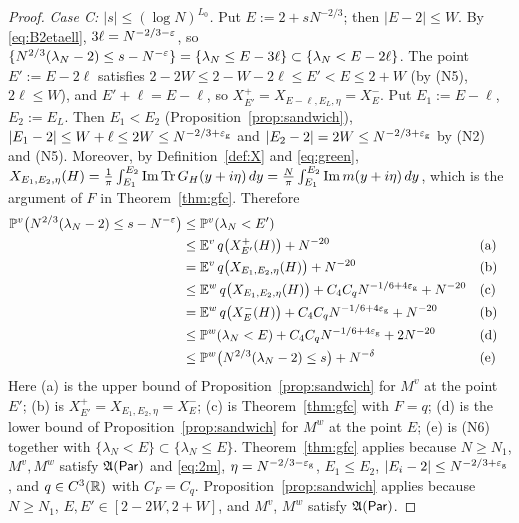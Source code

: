 \begin{proof}
\emph{Case C: $|s|\le(\log N)^{L_0}$.} Put $E:=2+sN^{-2/3}$; then $|E-2|\le W$. By \eqref{eq:B2etaell}, $3\ell=N^{-2/3-\varepsilon}$, so
$\{N^{2/3}(\lambda_N-2)\le s-N^{-\varepsilon}\}=\{\lambda_N\le E-3\ell\}\subset\{\lambda_N<E-2\ell\}$. The point $E':=E-2\ell$ satisfies $2-2W\le2-W-2\ell\le E'<E\le2+W$ (by (N5), $2\ell\le W$),
and $E'+\ell=E-\ell$, so $X^+_{E'}=X_{E-\ell,E_L,\eta}=X^-_E$. Put $E_1:=E-\ell$, $E_2:=E_L$. Then $E_1<E_2$ (Proposition~\ref{prop:sandwich}),
$|E_1-2|\le W+\ell\le2W\le N^{-2/3+\varepsilon_{\mathrm g}}$ and $|E_2-2|=2W\le N^{-2/3+\varepsilon_{\mathrm g}}$ by (N2) and (N5). Moreover, by Definition~\ref{def:X} and \eqref{eq:green},
$X_{E_1,E_2,\eta}(H)=\frac1\pi\int_{E_1}^{E_2}\operatorname{Im}\operatorname{Tr} G_H(y+i\eta)\,dy=\frac N\pi\int_{E_1}^{E_2}\operatorname{Im} m(y+i\eta)\,dy$, which is the argument of $F$ in Theorem~\ref{thm:gfc}. Therefore
\begin{align*}
\mathbb{P}^v\big(N^{2/3}(\lambda_N-2)\le s-N^{-\varepsilon}\big)&\le\mathbb{P}^v(\lambda_N<E')\\
&\le\mathbb{E}^v\,q\big(X^+_{E'}(H)\big)+N^{-20}&&\text{(a)}\\
&=\mathbb{E}^v\,q\big(X_{E_1,E_2,\eta}(H)\big)+N^{-20}&&\text{(b)}\\
&\le\mathbb{E}^w\,q\big(X_{E_1,E_2,\eta}(H)\big)+C_4C_qN^{-1/6+4\varepsilon_{\mathrm g}}+N^{-20}&&\text{(c)}\\
&=\mathbb{E}^w\,q\big(X^-_{E}(H)\big)+C_4C_qN^{-1/6+4\varepsilon_{\mathrm g}}+N^{-20}&&\text{(b)}\\
&\le\mathbb{P}^w(\lambda_N<E)+C_4C_qN^{-1/6+4\varepsilon_{\mathrm g}}+2N^{-20}&&\text{(d)}\\
&\le\mathbb{P}^w\big(N^{2/3}(\lambda_N-2)\le s\big)+N^{-\delta}&&\text{(e)}
\end{align*}
Here (a) is the upper bound of Proposition~\ref{prop:sandwich} for $M^v$ at the point $E'$; (b) is $X^+_{E'}=X_{E_1,E_2,\eta}=X^-_E$; (c) is Theorem~\ref{thm:gfc} with
$F=q$; (d) is the lower bound of Proposition~\ref{prop:sandwich} for $M^w$ at the point $E$; (e) is (N6) together with $\{\lambda_N<E\}\subset\{\lambda_N\le E\}$.
Theorem~\ref{thm:gfc} applies because $N\ge N_1$, $M^v,M^w$ satisfy $\mathfrak{A}(\mathsf{Par})$ and \eqref{eq:2m}, $\eta=N^{-2/3-\varepsilon_{\mathrm g}}$, $E_1\le E_2$, $|E_i-2|\le N^{-2/3+\varepsilon_{\mathrm g}}$, and $q\in C^3(\mathbb{R})$
with $C_F=C_q$. Proposition~\ref{prop:sandwich} applies because $N\ge N_1$, $E,E'\in[2-2W,2+W]$, and $M^v$, $M^w$ satisfy $\mathfrak{A}(\mathsf{Par})$.
\end{proof}

